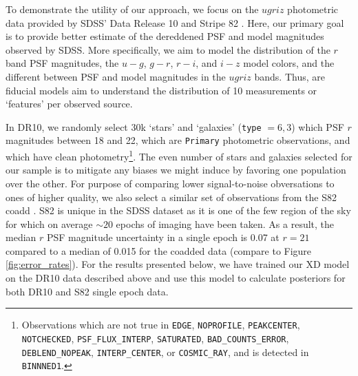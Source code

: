 \documentclass[12pt,preprint]{aastex}
\newcommand\ttt[1]{{\texttt{#1}}}
\begin{document}
To demonstrate the utility of our approach, we focus on the $ugriz$
photometric data provided by SDSS' Data Release 10 \citep[DR10,][]{ahn14} and
Stripe 82 \citep[S82,][]{annis14}.  Here, our primary goal is to
provide better estimate of the dereddened PSF and model magnitudes observed by
SDSS.  More specifically, we aim to model the distribution of the $r$ band PSF
magnitudes, the $u-g$, $g-r$, $r-i$, and $i-z$ model colors, and the different
between PSF and model magnitudes in the $ugriz$ bands.  Thus, are fiducial 
models aim to understand the distribution of 10 measurements or `features' per 
observed source.

In DR10, we randomly select 30k `stars' and `galaxies' (\ttt{type} $= 6, 3$)
which PSF $r$ magnitudes between 18 and 22, which are \ttt{Primary}
photometric observations, and which have clean
photometry\footnote{Observations which are not true in \ttt{EDGE},
\ttt{NOPROFILE}, \ttt{PEAKCENTER}, \ttt{NOTCHECKED}, \ttt{PSF\_FLUX\_INTERP},
\ttt{SATURATED}, \ttt{BAD\_COUNTS\_ERROR}, \ttt{DEBLEND\_NOPEAK},
\ttt{INTERP\_CENTER}, or \ttt{COSMIC\_RAY}, and is detected in
\ttt{BINNNED1}.}.  The even number of stars and galaxies selected for our
sample is to mitigate any biases we might induce by favoring one population
over the other.  For purpose of comparing lower signal-to-noise obversations
to ones of higher quality, we also select a similar set of observations from
the S82 coadd \citep{annis14}.  S82 is unique in the SDSS dataset as it is one
of the few region of the sky for which on average $\sim 20$ epochs of imaging
have been taken.  As a result, the median $r$ PSF magnitude uncertainty in a
single epoch is 0.07 at $r=21$ compared to a median of 0.015 for the coadded
data (compare to Figure 
\ref{fig:error_rates}).  For the results presented below, we have trained our
XD model on the DR10 data described above and use this model to calculate
posteriors for both DR10 and S82 single epoch data.
\end{document}
